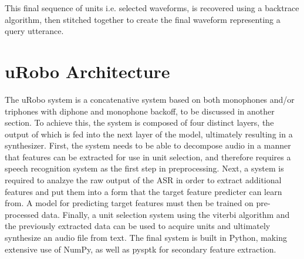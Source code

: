 \documentclass[10pt, journal, compsoc]{IEEEtran}
\begin{document}
\begin{algorithm}
\begin{algorithmic}[1]
\EndFor
{}
     \EndFor
\EndFor
{}
\EndFunction
\end{algorithmic}
\end{algorithm}
This final sequence of units i.e. selected waveforms, is recovered using a backtrace algorithm, then stitched together to create the final waveform representing a query utterance.
\section{uRobo Architecture}
The uRobo system is a concatenative system based on both monophones and/or triphones with diphone and monophone backoff, to be discussed in another section. To achieve this, the system is composed of four distinct layers, the output of which is fed into the next layer of the model, ultimately resulting in a synthesizer. First, the system needs to be able to decompose audio in a manner that features can be extracted for use in unit selection, and therefore requires a speech recognition system as the first step in preprocessing. Next, a system is required to analzye the raw output of the ASR in order to extract additional features and put them into a form that the target feature predicter can learn from. A model for predicting target features must then be trained on pre-processed data. Finally, a unit selection system using the viterbi algorithm and the previously extracted data can be used to acquire units and ultimately synthesize an audio file from text. The final system is built in Python, making extensive use of NumPy, as well as pysptk for secondary feature extraction.
\end{document}
